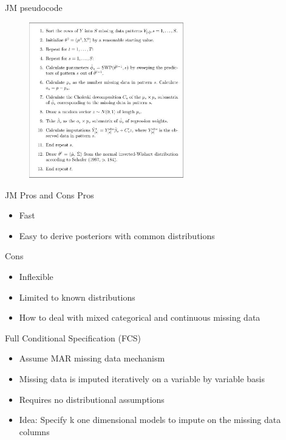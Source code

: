 \begin{frame}{JM pseudocode}
 \begin{figure}[h!]
  \centering
    \includegraphics[width=0.6\textwidth]{jm_algo}
\label{fig:jmexample}
\end{figure}
\end{frame}

\begin{frame}{JM Pros and Cons}
Pros
 \begin{itemize}
  \item Fast
  \item Easy to derive posteriors with common distributions
 \end{itemize}

 Cons
 \begin{itemize}
  \item Inflexible
  \item Limited to known distributions
  \item How to deal with mixed categorical and continuous missing data
 \end{itemize}

\end{frame}

\begin{frame}{Full Conditional Specification (FCS)}
 \begin{itemize}
  \item Assume MAR missing data mechanism %
  \item Missing data is imputed iteratively on a variable by variable basis
  \item Requires no distributional assumptions
  \item Idea: Specify k one dimensional models to impute on the missing data columns
 \end{itemize}

\end{frame}

